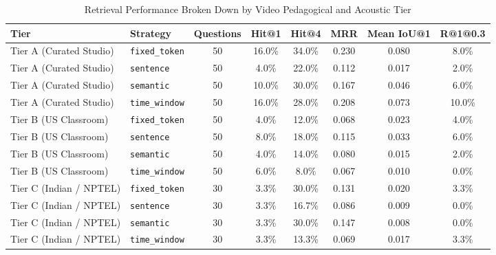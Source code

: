 \begin{table}[t]
\caption{Retrieval Performance Broken Down by Video Pedagogical and Acoustic Tier}
\label{tab:tier_breakdown}
\centering
\begin{tabular}{llcccccc}
\hline
\textbf{Tier} & \textbf{Strategy} & \textbf{Questions} & \textbf{Hit@1} & \textbf{Hit@4} & \textbf{MRR} & \textbf{Mean IoU@1} & \textbf{R@1@0.3} \\
\hline
Tier A (Curated Studio) & \texttt{fixed\_token} & 50 & 16.0\% & 34.0\% & 0.230 & 0.080 & 8.0\% \\
Tier A (Curated Studio) & \texttt{sentence} & 50 & 4.0\% & 22.0\% & 0.112 & 0.017 & 2.0\% \\
Tier A (Curated Studio) & \texttt{semantic} & 50 & 10.0\% & 30.0\% & 0.167 & 0.046 & 6.0\% \\
Tier A (Curated Studio) & \texttt{time\_window} & 50 & 16.0\% & 28.0\% & 0.208 & 0.073 & 10.0\% \\
Tier B (US Classroom) & \texttt{fixed\_token} & 50 & 4.0\% & 12.0\% & 0.068 & 0.023 & 4.0\% \\
Tier B (US Classroom) & \texttt{sentence} & 50 & 8.0\% & 18.0\% & 0.115 & 0.033 & 6.0\% \\
Tier B (US Classroom) & \texttt{semantic} & 50 & 4.0\% & 14.0\% & 0.080 & 0.015 & 2.0\% \\
Tier B (US Classroom) & \texttt{time\_window} & 50 & 6.0\% & 8.0\% & 0.067 & 0.010 & 0.0\% \\
Tier C (Indian / NPTEL) & \texttt{fixed\_token} & 30 & 3.3\% & 30.0\% & 0.131 & 0.020 & 3.3\% \\
Tier C (Indian / NPTEL) & \texttt{sentence} & 30 & 3.3\% & 16.7\% & 0.086 & 0.009 & 0.0\% \\
Tier C (Indian / NPTEL) & \texttt{semantic} & 30 & 3.3\% & 30.0\% & 0.147 & 0.008 & 0.0\% \\
Tier C (Indian / NPTEL) & \texttt{time\_window} & 30 & 3.3\% & 13.3\% & 0.069 & 0.017 & 3.3\% \\
\hline
\end{tabular}
\end{table}
